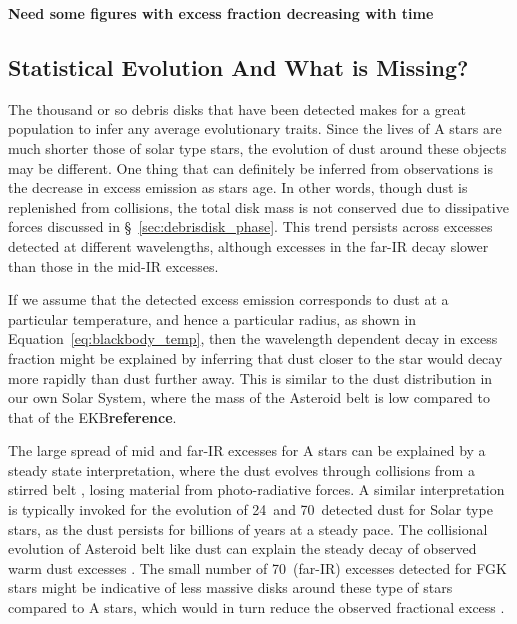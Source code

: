    \textbf{Need some figures with excess fraction decreasing with time}
   
    
\subsection{Statistical Evolution And What is Missing?}
    
    The thousand or so debris disks that have been detected makes for a great population to infer any average evolutionary traits. Since the lives of A stars are much shorter those of solar type stars, the evolution of dust around these objects may be different. One thing that can definitely be inferred from observations is the decrease in excess emission as stars age. In other words, though dust is replenished from collisions, the total disk mass is not conserved due to dissipative forces discussed in \S~\ref{sec:debrisdisk_phase}. This trend persists across excesses detected at different wavelengths, although excesses in the far-IR decay slower than those in the mid-IR excesses. 
    
    If we assume that the detected excess emission corresponds to dust at a particular temperature, and hence a particular radius, as shown in Equation~\ref{eq:blackbody_temp}, then the wavelength dependent decay in excess fraction might be explained by inferring that dust closer to the star would decay more rapidly than dust further away. This is similar to the dust distribution in our own Solar System, where the mass of the Asteroid belt is low compared to that of the EKB\textbf{reference}. 
    
    The large spread of mid and far-IR excesses for A stars can be explained by a steady state interpretation, where the dust evolves through collisions from a stirred belt \citep{Su2006, Wyatt2008}, losing material from photo-radiative forces. A similar interpretation is typically invoked for the evolution of 24\micron\ and 70\micron\ detected dust for Solar type stars, as the dust persists for billions of years at a steady pace. The collisional evolution of Asteroid belt like dust can explain the steady decay of observed warm dust excesses \citep{Wyatt2008}. The small number of 70\micron\ (far-IR) excesses detected for FGK stars might be indicative of less massive disks around these type of stars compared to A stars, which would in turn reduce the observed fractional excess \citep{Wyatt2008}. 
    
